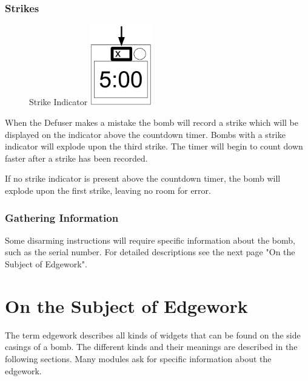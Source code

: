 \documentclass{../../ktane-mod}
\begin{document}
\subsubsection*{Strikes}
\begin{figure} %
  \vspace{-2\baselineskip}
  Strike Indicator
  \centering
  \includegraphics[height=3.5cm]{images/strike}
  \label{fig:Strikes}
\end{figure}
When the Defuser makes a mistake the bomb will record a strike which will be displayed on the indicator above the countdown timer.
Bombs with a strike indicator will explode upon the third strike.
The timer will begin to count down faster after a strike has been recorded.

If no strike indicator is present above the countdown timer, the bomb will explode upon the first strike, leaving no room for error.

\subsubsection*{Gathering Information}
Some disarming instructions will require specific information about the bomb, such as the serial number.
For detailed descriptions see the next page "On the Subject of Edgework".

\clearpage

\section*{On the Subject of Edgework}
The term edgework describes all kinds of widgets that can be found on the side casings of a bomb.
The different kinds and their meanings are described in the following sections.
Many modules ask for specific information about the edgework.
\end{document}
